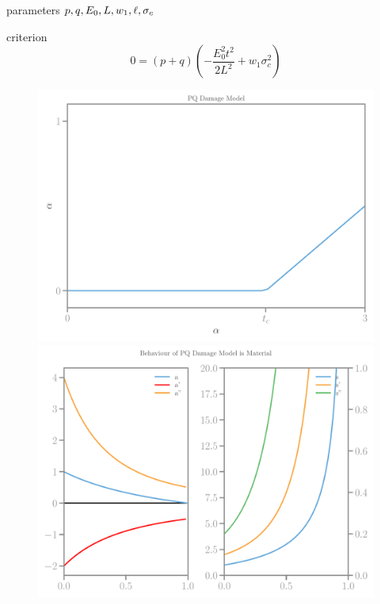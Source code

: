 \documentclass[]{article}
\begin{document}
parameters
$p, q, E_0, L, w_1, \ell, \sigma_c $

criterion
\begin{equation}
  \label{eqn:mod-criterion}
  0=
\left(p + q\right) \left(- \frac{ E_{0}^{2} t^{2}}{2L^{2}} + w_{1} \sigma_c^{2}\right)
\end{equation}



\begin{figure}[htbp]
  \centering
  \includegraphics[width=.33\textheight]{../figures/pq-alpha-homog.pdf}
  \includegraphics[width=.33\textheight]{../figures/pq-11-model.pdf}

\end{figure}
\end{document}
